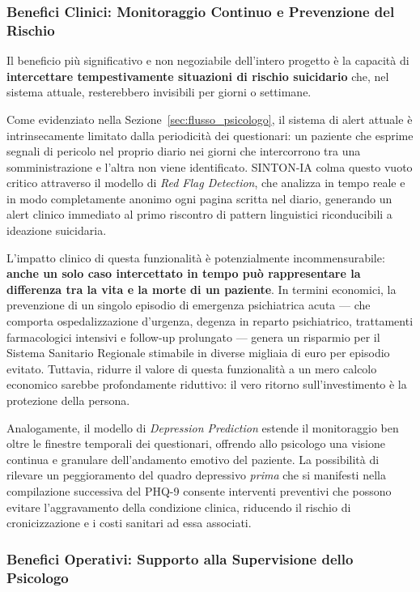 \subsubsection{Benefici Clinici: Monitoraggio Continuo e Prevenzione del Rischio}
\label{subsubsec:benefici_clinici}

Il beneficio più significativo e non negoziabile dell'intero progetto è la capacità di \textbf{intercettare tempestivamente situazioni di rischio suicidario} che, nel sistema attuale, resterebbero invisibili per giorni o settimane.

Come evidenziato nella Sezione~\ref{sec:flusso_psicologo}, il sistema di alert attuale è intrinsecamente limitato dalla periodicità dei questionari: un paziente che esprime segnali di pericolo nel proprio diario nei giorni che intercorrono tra una somministrazione e l'altra non viene identificato. SINTON-IA colma questo vuoto critico attraverso il modello di \textit{Red Flag Detection}, che analizza in tempo reale e in modo completamente anonimo ogni pagina scritta nel diario, generando un alert clinico immediato al primo riscontro di pattern linguistici riconducibili a ideazione suicidaria.

L'impatto clinico di questa funzionalità è potenzialmente incommensurabile: \textbf{anche un solo caso intercettato in tempo può rappresentare la differenza tra la vita e la morte di un paziente}. In termini economici, la prevenzione di un singolo episodio di emergenza psichiatrica acuta --- che comporta ospedalizzazione d'urgenza, degenza in reparto psichiatrico, trattamenti farmacologici intensivi e follow-up prolungato --- genera un risparmio per il Sistema Sanitario Regionale stimabile in diverse migliaia di euro per episodio evitato. Tuttavia, ridurre il valore di questa funzionalità a un mero calcolo economico sarebbe profondamente riduttivo: il vero ritorno sull'investimento è la protezione della persona.

Analogamente, il modello di \textit{Depression Prediction} estende il monitoraggio ben oltre le finestre temporali dei questionari, offrendo allo psicologo una visione continua e granulare dell'andamento emotivo del paziente. La possibilità di rilevare un peggioramento del quadro depressivo \textit{prima} che si manifesti nella compilazione successiva del PHQ-9 consente interventi preventivi che possono evitare l'aggravamento della condizione clinica, riducendo il rischio di cronicizzazione e i costi sanitari ad essa associati.

\subsubsection{Benefici Operativi: Supporto alla Supervisione dello Psicologo}
\label{subsubsec:benefici_operativi}

